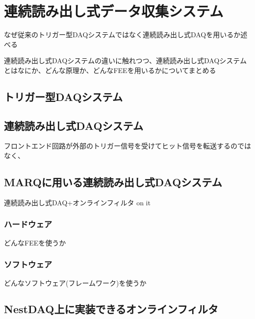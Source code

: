 \documentclass[../main.tex]{subfiles}
\begin{document}
\section{連続読み出し式データ収集システム}
\label{sec:background}
なぜ従来のトリガー型DAQシステムではなく連続読み出し式DAQを用いるか述べる

連続読み出し式DAQシステムの違いに触れつつ、連続読み出し式DAQシステムとはなにか、どんな原理か、どんなFEEを用いるかについてまとめる
\subsection{トリガー型DAQシステム}
\subsection{連続読み出し式DAQシステム}
フロントエンド回路が外部のトリガー信号を受けてヒット信号を転送するのではなく、
\subsection{MARQに用いる連続読み出し式DAQシステム}
連続読み出し式DAQ+オンラインフィルタ on it
\subsubsection{ハードウェア}
どんなFEEを使うか
\subsubsection{ソフトウェア}
どんなソフトウェア(フレームワーク)を使うか
\subsection{NestDAQ上に実装できるオンラインフィルタ}
\end{document}
